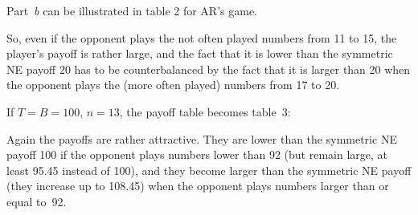 \begin{Article}
\begin{refsection}[Umbhauer]
Part~\emph{b} can be illustrated in table 2 for AR's game.

\begin{table}[h!]
\caption{Mixed-strategy mean MR payoff in AR's game as a function\\
of the amount chosen by the opponent}\label{tab2}
\centering
{}
\end{table}


So, even if the opponent plays the not often played numbers from 11 to
15, the player's payoff is rather large, and the fact that it is lower
than the symmetric NE payoff 20 has to be counterbalanced by the fact
that it is larger than 20 when the opponent plays the (more often
played) numbers from 17 to 20.

If $T = B = 100$, $n=13$, the payoff table becomes table~3:

\begin{table}[h!]
\caption{Mixed-strategy mean MR payoff in the 11--100 money
request game\\ with bonus 100 as a function of the amount chosen by the
opponent}\label{tab3}
\centering
{}
\end{table}

Again the payoffs are rather attractive. They are lower than the
symmetric NE payoff 100 if the opponent plays numbers lower than 92 (but
remain large, at least 95.45 instead of 100), and they become larger
than the symmetric NE payoff (they increase up to 108.45) when the
opponent plays numbers larger than or equal to~92.


\end{refsection}
\end{Article}

